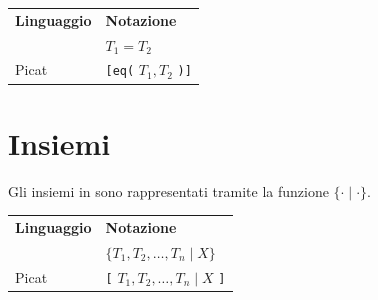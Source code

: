 \documentclass[12pt,a4paper,openright]{book} %
\begin{document}
\begin{appendices}
\begin{table}[H]
\center
\begin{tabular}{l l}
\textbf{Linguaggio} & \textbf{Notazione} \\
\clpset{} & $T_1 = T_2$ \\
Picat & \verb|[eq(| $T_1, T_2$ \verb|)]| \\
\end{tabular}
\end{table}

\section{Insiemi}

Gli insiemi in \clpset{} sono rappresentati tramite la funzione $\{ \cdot \mid \cdot \}$.

\begin{table}[H]
\center
\begin{tabular}{l l}
\textbf{Linguaggio} & \textbf{Notazione} \\
\clpset{} & $\{ T_1, T_2, \ldots, T_n \mid X \}$ \\
Picat & \verb|[| $T_1, T_2, \ldots, T_n \mid X$ \verb|]| \\
\end{tabular}
\end{table}

\end{appendices}


\printbibliography
\end{document}
